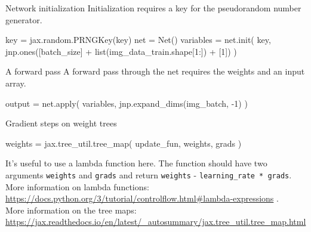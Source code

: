 \documentclass{beamer}
\begin{document}
    \begin{frame}[fragile]{Network initialization}
      Initialization requires a key for the pseudorandom number generator.
      \begin{python}
      key = jax.random.PRNGKey(key)
      net = Net()
      variables = net.init(
          key, jnp.ones([batch_size]
          + list(img_data_train.shape[1:])
          + [1])
      )
      \end{python} 
    \end{frame}

    \begin{frame}[fragile]{A forward pass}
      A forward pass through the net requires the weights and an input array.
      \begin{python}
      output = net.apply(
        variables,
        jnp.expand_dims(img_batch, -1)
      )
      \end{python}
    \end{frame}

    \begin{frame}[fragile]{Gradient steps on weight trees} 
      \begin{python}
      weights = jax.tree_util.tree_map(
          update_fun,
          weights, grads
      )
      \end{python} 
      It's useful to use a lambda function here.
      The function should have two arguments \texttt{weights} and \texttt{grads} and return
      \texttt{weights} - \texttt{learning\_rate * grads}. \\
      More information on lambda functions: \\
      \url{https://docs.python.org/3/tutorial/controlflow.html#lambda-expressions} . \\
      More information on the tree maps: \\
      \url{https://jax.readthedocs.io/en/latest/_autosummary/jax.tree_util.tree_map.html}
    \end{frame}
\end{document}
